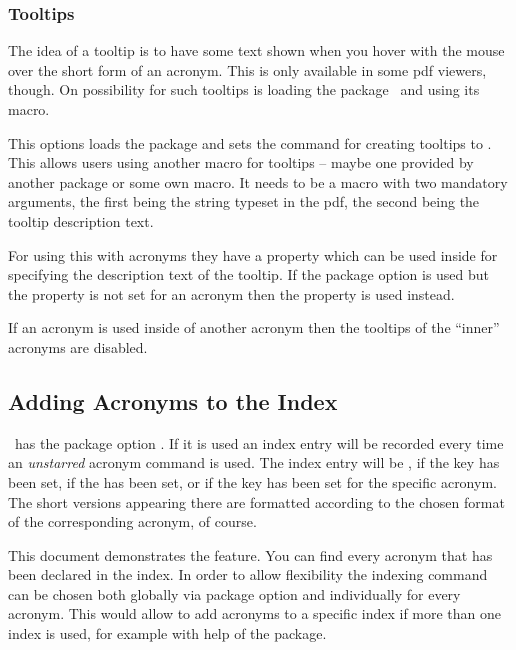 \documentclass[load-preamble+]{cnltx-doc}
\begin{document}
\subsubsection{Tooltips}

The idea of a tooltip is to have some text shown when you hover with the
mouse over the short form of an acronym.  This is only available in some
\acs{pdf} viewers, though.  On possibility for such tooltips is loading the
 package~\cite{pkg:pdfcomment} and using its 
macro.

\begin{options}
    This options loads the  package and sets
    the command for creating tooltips to .
    This allows users using another macro for tooltips --
    maybe one provided by another package or some own macro.  It needs to be a
    macro with two mandatory arguments, the first being the string typeset in
    the \acs{pdf}, the second being the tooltip description text.
\end{options}

For using this with acronyms they have a property  which can
be used inside  for specifying the description text of the
tooltip.  If the  package option is used but the property is
not set for an acronym then the  property is used instead.

If an acronym is used inside of another acronym then the tooltips of the
``inner'' acronyms are disabled.

\subsection{Adding Acronyms to the Index}\label{ssec:index}
\acro\ has the package option .  If it is used an index entry
will be recorded every time an \emph{unstarred} acronym command is used.  The
index entry will be ,
 if the  key has been set,
 if the  has been set,
or  if the key  has been set for the specific
acronym.  The short versions appearing there are formatted according to the
chosen format of the corresponding acronym, of course.

This document demonstrates the feature.  You can find every acronym that has
been declared in the index.  In order to allow flexibility the indexing
command can be chosen both globally via package option and individually for
every acronym.  This would allow to add acronyms to a specific index if more
than one index is used, for example with help of the  package.
\end{document}
